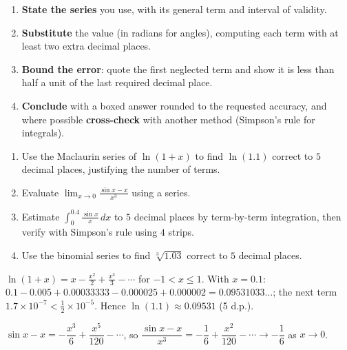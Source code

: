 \documentclass[11pt]{article}
\newcounter{popsec}
\newcounter{popsub}
\newcommand{\courssub}[1]{%
  \stepcounter{popsub}%
  \par\vspace{9pt}\noindent{\popxbold\fontsize{11.5}{13}\selectfont\color{popink}{\color{poporange}\thepopsec.\thepopsub}\hspace{6pt}#1}\par\nopagebreak\vspace{4pt}
}
\begin{document}
\courssub{GCE Exam Technique}

\begin{aretenir}
\begin{enumerate}
\item \textbf{State the series} you use, with its general term and interval of validity.
\item \textbf{Substitute} the value (in radians for angles), computing each term with at least two extra decimal places.
\item \textbf{Bound the error}: quote the first neglected term and show it is less than half a unit of the last required decimal place.
\item \textbf{Conclude} with a boxed answer rounded to the requested accuracy, and where possible \textbf{cross-check} with another method (Simpson's rule for integrals).
\end{enumerate}
\end{aretenir}

\begin{exercice}[Practice]
\begin{enumerate}
\item Use the Maclaurin series of $\ln(1+x)$ to find $\ln(1.1)$ correct to $5$ decimal places, justifying the number of terms.
\item Evaluate $\displaystyle\lim_{x\to 0}\frac{\sin x - x}{x^3}$ using a series.
\item Estimate $\displaystyle\int_0^{0.4}\frac{\sin x}{x}\,dx$ to $5$ decimal places by term-by-term integration, then verify with Simpson's rule using $4$ strips.
\item Use the binomial series to find $\sqrt[3]{1.03}$ correct to $5$ decimal places.
\end{enumerate}
\end{exercice}

\begin{corrige}[Exercise 1]
$\ln(1+x) = x - \frac{x^2}{2} + \frac{x^3}{3} - \cdots$ for $-1 < x \le 1$. With $x = 0.1$: $0.1 - 0.005 + 0.00033333 - 0.000025 + 0.000002 = 0.09531033\ldots$; the next term $1.7\times 10^{-7} < \frac12\times 10^{-5}$. Hence $\ln(1.1) \approx 0.09531$ (5 d.p.).
\end{corrige}

\begin{corrige}[Exercise 2]
$\sin x - x = -\dfrac{x^3}{6} + \dfrac{x^5}{120} - \cdots$, so $\dfrac{\sin x - x}{x^3} = -\dfrac{1}{6} + \dfrac{x^2}{120} - \cdots \to -\dfrac{1}{6}$ as $x \to 0$.
\end{corrige}
\end{document}
